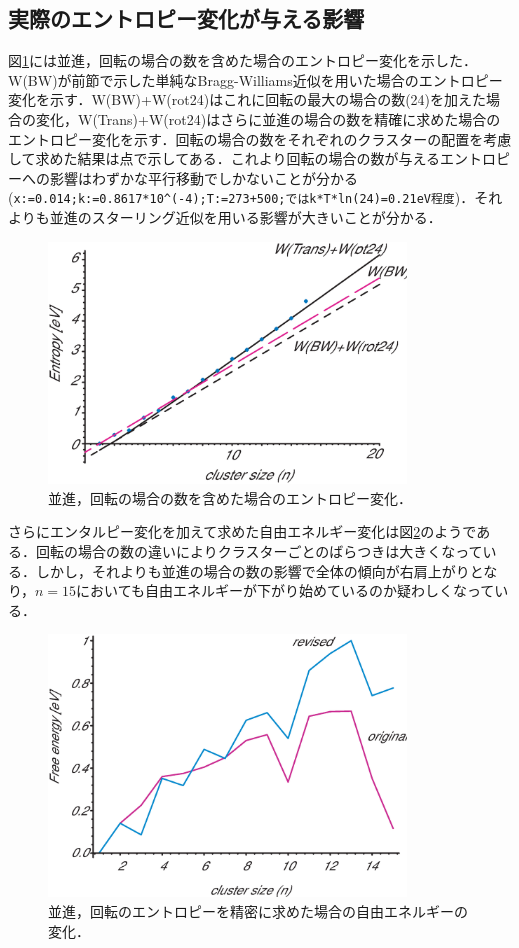 \documentclass[a4j,10pt]{jarticle}
\begin{document}
\subsection{実際のエントロピー変化が与える影響}
図\ref{EntropyRev}には並進，回転の場合の数を含めた場合のエントロピー変化を示した．W(BW)が前節で示した単純なBragg-Williams近似を用いた場合のエントロピー変化を示す．W(BW)+W(rot24)はこれに回転の最大の場合の数(24)を加えた場合の変化，W(Trans)+W(rot24)はさらに並進の場合の数を精確に求めた場合のエントロピー変化を示す．回転の場合の数をそれぞれのクラスターの配置を考慮して求めた結果は点で示してある．これより回転の場合の数が与えるエントロピーへの影響はわずかな平行移動でしかないことが分かる(\verb"x:=0.014;k:=0.8617*10^(-4);T:=273+500;ではk*T*ln(24)=0.21eV程度")．それよりも並進のスターリング近似を用いる影響が大きいことが分かる．
\begin{figure}\begin{center}
\includegraphics[width=95mm]{./figs/EntropyRev.eps}
\caption{並進，回転の場合の数を含めた場合のエントロピー変化．}
\label{EntropyRev}
\end{center}\end{figure}

さらにエンタルピー変化を加えて求めた自由エネルギー変化は図\ref{FreeEnergyRev}のようである．回転の場合の数の違いによりクラスターごとのばらつきは大きくなっている．しかし，それよりも並進の場合の数の影響で全体の傾向が右肩上がりとなり，$n=15$においても自由エネルギーが下がり始めているのか疑わしくなっている．
\begin{figure}\begin{center}
\includegraphics[width=95mm]{./figs/FreeEnergyRev.eps}
\caption{並進，回転のエントロピーを精密に求めた場合の自由エネルギーの変化．}
\label{FreeEnergyRev}
\end{center}\end{figure}
\end{document}
